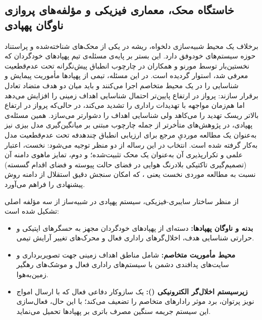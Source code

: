 \documentclass[oneside,openany,phd]{TMU-Thesis}
\begin{document}
\subsection{خاستگاه محک، معماری فیزیکی و مؤلفه‌های پروازی ناوگان پهپادی}
\label{subsec:dartsim_origin}

برخلاف یک محیط شبیه‌سازی دلخواه،  ریشه در یکی از محک‌های شناخته‌شده و پراستناد حوزه سیستم‌های خودوفق دارد. این بستر بر پایه‌ی مسئله‌ی تیم پهپادهای خودگردان که نخستین‌بار توسط مورنو و همکاران \cite{moreno2015proactive} در چارچوب انطباق پیش‌نگرانه تحت عدم‌قطعیت معرفی شد، استوار گردیده است. در این مسئله، تیمی از پهپادها مأموریت پیمایش و شناسایی را در یک محیط متخاصم اجرا می‌کنند و باید میان دو هدف متضاد تعادل برقرار سازند: پرواز در ارتفاع پایین‌تر احتمال شناسایی اهداف زمینی را افزایش می‌دهد اما هم‌زمان مواجهه با تهدیدات راداری را تشدید می‌کند، در حالی‌که پرواز در ارتفاع بالاتر ریسک تهدید را می‌کاهد ولی شناسایی اهداف را دشوارتر می‌سازد. همین مسئله‌ی پهپادی، در پژوهش‌های متأخرتر از جمله چارچوب  مبتنی بر میانگین‌گیری مدل بیزی \cite{camilli2025manyobjective} نیز به‌عنوان یک مطالعه موردیِ مرجع برای ارزیابی انطباق چندهدفه تحت عدم‌قطعیت مدل به‌کار گرفته شده است. انتخاب  در این رساله از دو منظر توجیه می‌شود: نخست، اعتبار علمی و تکرارپذیری آن به‌عنوان یک محک تثبیت‌شده؛ و دوم، تمایز ماهوی دامنه آن (تصمیم‌گیری تاکتیکی بلادرنگ هوایی در فضای حالت پیوسته و فضای اقدام گسسته) نسبت به مطالعه موردی نخست یعنی ، که امکان سنجش دقیق استقلال از دامنه روش پیشنهادی را فراهم می‌آورد.

از منظر ساختار سایبری-فیزیکی، سیستم پهپادی در شبیه‌ساز  از سه مؤلفه اصلی تشکیل شده است:
\begin{itemize}
    \item \textbf{بدنه و ناوگان پهپادها:} دسته‌ای از پهپادهای خودگردان مجهز به حسگرهای اپتیکی و حرارتی شناسایی هدف، اخلال‌گرهای راداری فعال و محرک‌های تغییر آرایش تیمی.
    \item \textbf{محیط مأموریت متخاصم:} شامل مناطق اهداف زمینی جهت تصویربرداری و سایت‌های پدافندی دشمن با سیستم‌های راداری فعال و موشک‌های رهگیر زمین‌به‌هوا.
    \item \textbf{زیرسیستم اخلال‌گر الکترونیکی ():} یک سازوکار دفاعی فعال که با ارسال امواج نویز پرتوان، برد موثر رادارهای متخاصم را تضعیف می‌کند؛ با این حال، فعال‌سازی این سیستم جریمه سنگین مصرف باتری بر پهپادها تحمیل می‌نماید.
\end{itemize}
\end{document}
